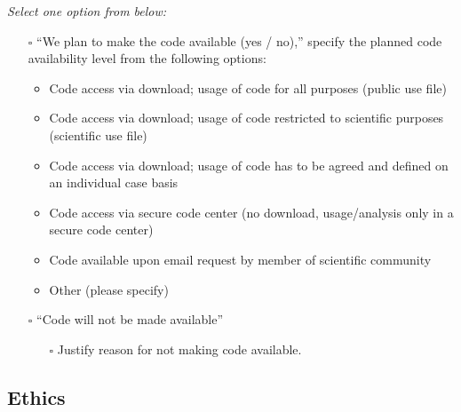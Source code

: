 \documentclass[
]{article}
\providecommand{\tightlist}{%
  \setlength{\itemsep}{0pt}\setlength{\parskip}{0pt}}\usepackage{longtable,booktabs,array}
\begin{document}
\begin{tcolorbox}[enhanced jigsaw, rightrule=.15mm, titlerule=0mm, coltitle=black, opacityback=0, bottomrule=.15mm, colback=white, opacitybacktitle=0.6, title=\textcolor{quarto-callout-caution-color}{\faFire}\hspace{0.5em}{Preregistration Item}, toprule=.15mm, colframe=quarto-callout-caution-color-frame, left=2mm, leftrule=.75mm, breakable, bottomtitle=1mm, colbacktitle=quarto-callout-caution-color!10!white, toptitle=1mm, arc=.35mm]

\emph{Select one option from below:}

\begin{itemize}
\tightlist
\item[$\square$]
  ``We plan to make the code available (yes / no),'' specify the planned
  code availability level from the following options:

  \begin{itemize}
  \tightlist
  \item
    Code access via download; usage of code for all purposes (public use
    file)
  \item
    Code access via download; usage of code restricted to scientific
    purposes (scientific use file)
  \item
    Code access via download; usage of code has to be agreed and defined
    on an individual case basis
  \item
    Code access via secure code center (no download, usage/analysis only
    in a secure code center)
  \item
    Code available upon email request by member of scientific community
  \item
    Other (please specify)
  \end{itemize}
\item[$\square$]
  ``Code will not be made available''

  \begin{itemize}
  \tightlist
  \item[$\square$]
    Justify reason for not making code available.
  \end{itemize}
\end{itemize}

\end{tcolorbox}

\subsection*{Ethics}\label{ethics}
\end{document}
